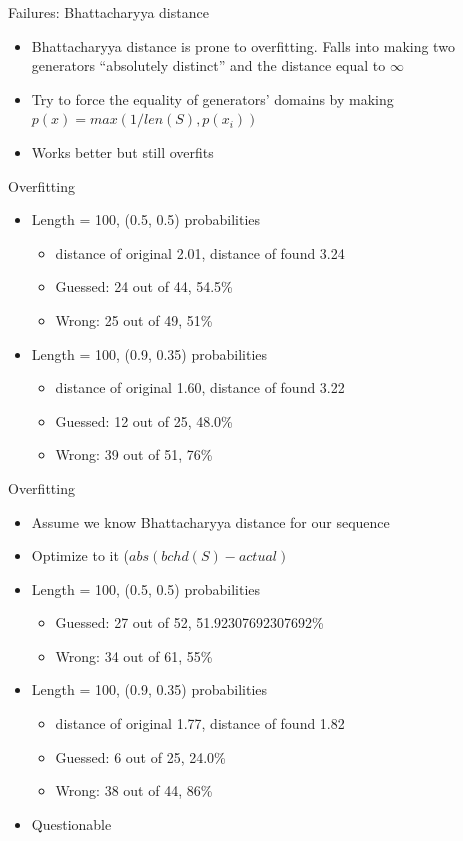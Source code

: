 \documentclass[hyperref=unicode,graphics=pdflatex,13pt]{beamer}
\begin{document}
\begin{frame}{Failures: Bhattacharyya distance}
\begin{itemize}
 \item Bhattacharyya distance is prone to overfitting. Falls into making two generators ``absolutely distinct'' and the distance equal to $\infty$
 \item Try to force the equality of generators' domains by making $p(x) = max(1/len(S), p(x_i))$
 \item Works better but still overfits
\end{itemize}
\end{frame}

\begin{frame}{Overfitting}
  \begin{itemize}
   \item Length = 100, (0.5, 0.5) probabilities
   \begin{itemize}
   \item distance of original 2.01, distance of found 3.24
   \item Guessed: 24 out of 44, 54.5\%
   \item Wrong: 25 out of 49, 51\%
   \end{itemize}
  \item Length = 100, (0.9, 0.35) probabilities
  \begin{itemize}
   \item distance of original 1.60, distance of found 3.22
   \item Guessed: 12 out of 25, 48.0\%
   \item Wrong: 39 out of 51, 76\%
  \end{itemize}


  \end{itemize}
\end{frame}

\begin{frame}{Overfitting}
 \begin{itemize}
  \item Assume we know Bhattacharyya distance for our sequence
  \item Optimize to it ($ abs(bchd(S)-actual) $
  \item Length = 100, (0.5, 0.5) probabilities
  \begin{itemize}
   \item Guessed: 27 out of 52, 51.92307692307692\%
   \item Wrong: 34 out of 61, 55\%
  \end{itemize}
  \item Length = 100, (0.9, 0.35) probabilities
  \begin{itemize}
   \item distance of original 1.77, distance of found 1.82
   \item Guessed: 6 out of 25, 24.0\%
   \item Wrong: 38 out of 44, 86\%
  \end{itemize}
  \item Questionable
  \end{itemize}
\end{frame}
\end{document}

